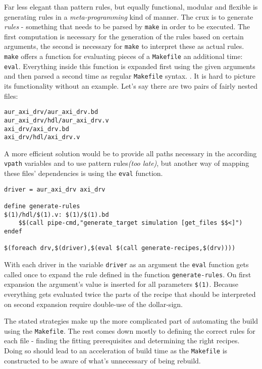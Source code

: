 Far less elegant than pattern rules, but equally functional, modular and flexible is generating rules in a \textit{meta-programming} kind of manner. The crux is to generate \textit{rules} - something that needs to be parsed by \texttt{make} in order to be executed. The first computation is necessary for the generation of the rules based on certain arguments, the second is necessary for \texttt{make} to interpret these as actual rules. \texttt{make} offers a function for evaluating pieces of a \texttt{Makefile} an additional time: \texttt{eval}. Everything inside this function is expanded first using the given arguments and then parsed a second time as regular \texttt{Makefile} syntax. \cite[see][p. 93]{Make16}. It is hard to picture its functionality without an example. Let's say there are two pairs of fairly nested files:
\begin{lstlisting}
aur_axi_drv/aur_axi_drv.bd
aur_axi_drv/hdl/aur_axi_drv.v
axi_drv/axi_drv.bd
axi_drv/hdl/axi_drv.v
\end{lstlisting}
\noindent
A more efficient solution would be to provide all paths necessary in the according \texttt{vpath} variables and to use pattern rules\textit{(too late)}, but another way of mapping these files' dependencies is using the \texttt{eval} function.
\begin{lstlisting}[language={[gnu] make}]
driver = aur_axi_drv axi_drv

define generate-rules
$(1)/hdl/$(1).v: $(1)/$(1).bd
	$$(call pipe-cmd,"generate_target simulation [get_files $$<]")
endef

$(foreach drv,$(driver),$(eval $(call generate-recipes,$(drv))))
\end{lstlisting}
\noindent
With each driver in the variable \texttt{driver} as an argument the \texttt{eval} function gets called once to expand the rule defined in the function \texttt{generate-rules}. On first expansion the argument's value is inserted for all parameters \texttt{\$(1)}. Because everything gets evaluated twice the parts of the recipe that should be interpreted on second expansion require double-use of the dollar-sign.

\bigskip

\noindent
The stated strategies make up the more complicated part of automating the build using the \texttt{Makefile}. The rest comes down mostly to defining the correct rules for each file - finding the fitting prerequisites and determining the right recipes. Doing so should lead to an acceleration of build time as the \texttt{Makefile} is constructed to be aware of what's unnecessary of being rebuild.